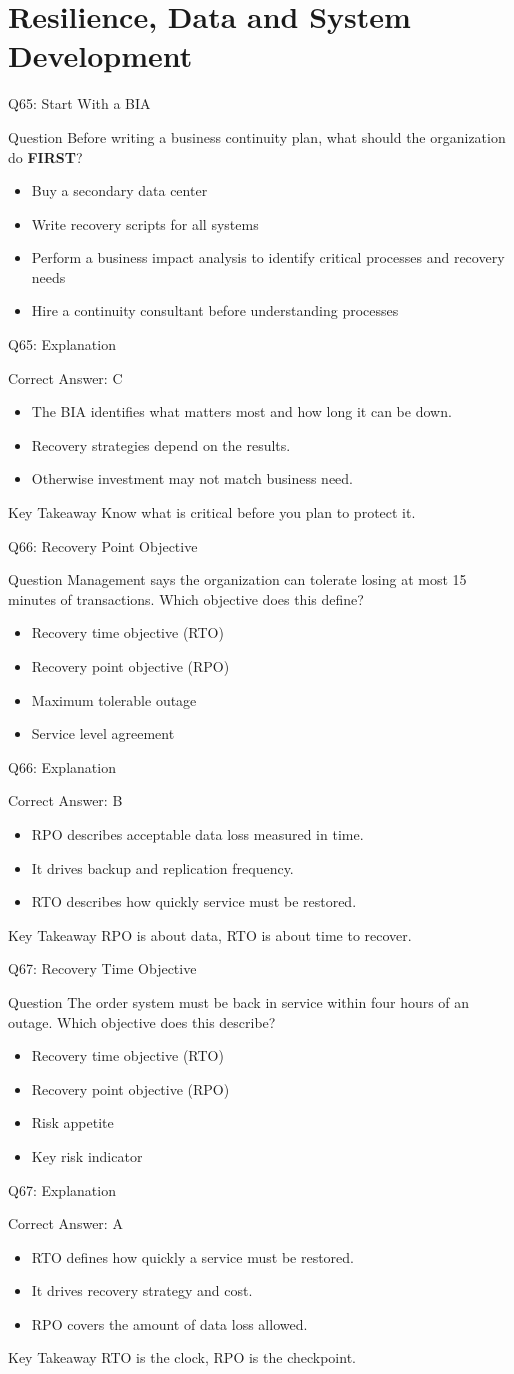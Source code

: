 \documentclass[aspectratio=169]{beamer}
\newcommand{\hq}[7]{%
	\begin{frame}{Q#1: #2}
		\begin{block}{Question}
			#3
		\end{block}
		\begin{itemize}
			#4
		\end{itemize}
	\end{frame}
	\begin{frame}{Q#1: Explanation}
		\begin{block}{Correct Answer: #5}
			\begin{itemize}
				#6
			\end{itemize}
		\end{block}
		\begin{alertblock}{Key Takeaway}
			#7
		\end{alertblock}
	\end{frame}
}
\begin{document}
	\section{Resilience, Data and System Development}
	
	\hq{65}{Start With a BIA}
	{Before writing a business continuity plan, what should the organization do \textbf{FIRST}?}
	{\item[\textbf{(A)}] Buy a secondary data center
		\item[\textbf{(B)}] Write recovery scripts for all systems
		\item[\textbf{(C)}] Perform a business impact analysis to identify critical processes and recovery needs
		\item[\textbf{(D)}] Hire a continuity consultant before understanding processes}
	{C}
	{\item The BIA identifies what matters most and how long it can be down.
		\item Recovery strategies depend on the results.
		\item Otherwise investment may not match business need.}
	{Know what is critical before you plan to protect it.}
	
	\hq{66}{Recovery Point Objective}
	{Management says the organization can tolerate losing at most 15 minutes of transactions. Which objective does this define?}
	{\item[\textbf{(A)}] Recovery time objective (RTO)
		\item[\textbf{(B)}] Recovery point objective (RPO)
		\item[\textbf{(C)}] Maximum tolerable outage
		\item[\textbf{(D)}] Service level agreement}
	{B}
	{\item RPO describes acceptable data loss measured in time.
		\item It drives backup and replication frequency.
		\item RTO describes how quickly service must be restored.}
	{RPO is about data, RTO is about time to recover.}
	
	\hq{67}{Recovery Time Objective}
	{The order system must be back in service within four hours of an outage. Which objective does this describe?}
	{\item[\textbf{(A)}] Recovery time objective (RTO)
		\item[\textbf{(B)}] Recovery point objective (RPO)
		\item[\textbf{(C)}] Risk appetite
		\item[\textbf{(D)}] Key risk indicator}
	{A}
	{\item RTO defines how quickly a service must be restored.
		\item It drives recovery strategy and cost.
		\item RPO covers the amount of data loss allowed.}
	{RTO is the clock, RPO is the checkpoint.}
	
\end{document}
